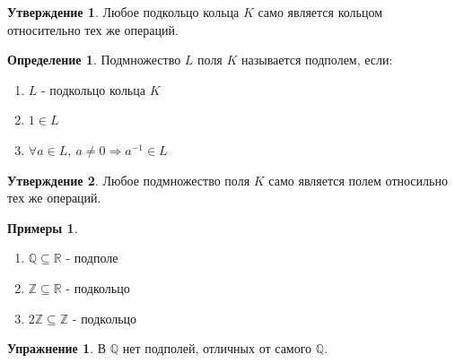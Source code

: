 \documentclass[a4paper, 12pt]{article}
\newcommand{\R}{\mathbb R}
\newcommand{\Q}{\mathbb Q}
\newcommand{\Z}{\mathbb Z}
\newcommand\tab[1][.5cm]{\hspace*{#1}}
\theoremstyle{definition}
\newtheorem*{definition}{Определение}
\newtheorem*{subtheorem}{Утверждение}
\newtheorem*{example}{Примеры}
\newtheorem*{lalala}{Упражнение}
\begin{document}
  \begin{subtheorem}
    Любое подкольцо кольца $K$ само является кольцом относительно тех же операций.  
  \end{subtheorem}
  \begin{definition}
    Подмножество $L$ поля $K$ называется подполем, если:
    \begin{enumerate}
      \item $L$ - подкольцо кольца $K$
      \item $1 \in L$
      \item $\forall a \in L, \ a \neq 0 \Longrightarrow a^{-1} \in L$   
    \end{enumerate}
  \end{definition}
  \begin{subtheorem}
    Любое подмножество поля $K$ само является полем относильно тех же операций.  
  \end{subtheorem}  
  \begin{example} \tab
    \begin{enumerate}
      \item $\Q \subseteq \R$ - подполе
      \item $\Z \subseteq \R$ - подкольцо
      \item $2\Z \subseteq \Z$ - подкольцо
    \end{enumerate}
  \end{example} 
  \begin{lalala}
    В $\Q$ нет подполей, отличных от самого $\Q$.
  \end{lalala}
\end{document}
